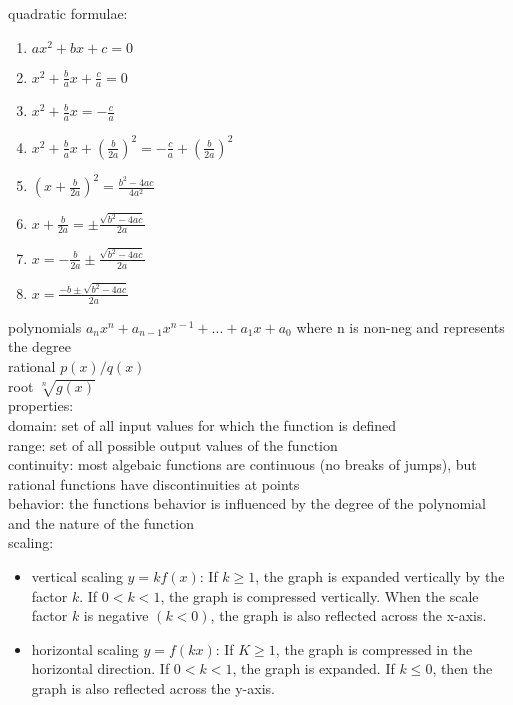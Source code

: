 \documentclass{article}
\begin{document}
quadratic formulae:

	\begin{enumerate}
		\item $ax^2 + bx + c = 0$
		\item $x^2 + \frac{b}{a}x + \frac{c}{a} = 0$
		\item $x^2 + \frac{b}{a}x = -\frac{c}{a}$
		\item $x^2 + \frac{b}{a}x + \left( \frac{b}{2a} \right)^2 = -\frac{c}{a} + \left( \frac{b}{2a} \right)^2$
		\item $\left( x + \frac{b}{2a} \right)^2 = \frac{b^2 - 4ac}{4a^2}$
		\item $x + \frac{b}{2a} = \pm \frac{\sqrt{b^2 - 4ac}}{2a}$
		\item $x = -\frac{b}{2a} \pm \frac{\sqrt{b^2 - 4ac}}{2a}$
		\item $x = \frac{-b \pm \sqrt{b^2 - 4ac}}{2a}$
	\end{enumerate}

polynomials $a_nx^n + a_{n-1}x^{n-1} + ... + a_1x + a_0$ where n is non-neg and represents the degree\\

rational $p(x)/q(x)$\\

root $\sqrt[n]{g(x)}$\\

properties:\\
	domain: set of all input values for which the function is defined\\
	range: set of all possible output values of the function\\
	
	continuity: most algebaic functions are continuous (no breaks of jumps), but rational functions have discontinuities at points\\
		
	behavior: the functions behavior is influenced by the degree of the polynomial and the nature of the function\\


	scaling:
		\begin{itemize}
			\item{vertical scaling} $y = kf(x)$: If $k \geq 1$, the graph is expanded vertically by the factor $k$. If $0 < k < 1$, the graph is compressed vertically. When the scale factor $k$ is negative $(k < 0)$, the graph is also reflected across the x-axis.
			\item{horizontal scaling} $y = f(kx)$: If $K \geq 1$, the graph is compressed in the horizontal direction. If $0 < k < 1$, the graph is expanded. If $k \leq 0$, then the graph is also reflected across the y-axis.
		\end{itemize}
\end{document}
